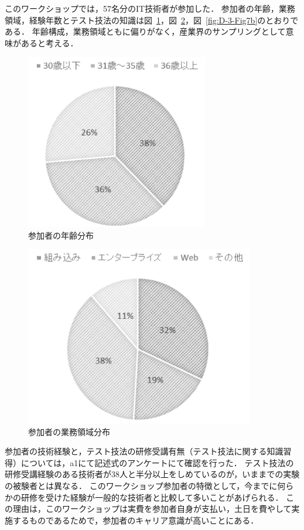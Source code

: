 このワークショップでは，57名分のIT技術者が参加した．
参加者の年齢，業務領域，経験年数とテスト技法の知識は図~\ref{fig:D-3-Fig6}，図~\ref{fig:D-3-Fig7}，図~\ref{fig:D-3-Fig7b}のとおりである．
年齢構成，業務領域ともに偏りがなく，産業界のサンプリングとして意味があると考える．

\begin{figure}[H]
\begin{center}
\includegraphics[width=8cm]{./image/D-3-Fig6.png}
\caption{参加者の年齢分布}
\label{fig:D-3-Fig6}
\end{center}
\end{figure}

\begin{figure}[H]
\begin{center}
\includegraphics[width=10cm]{./image/D-3-Fig7.png}
\caption{参加者の業務領域分布}
\label{fig:D-3-Fig7}
\end{center}
\end{figure}

参加者の技術経験と，テスト技法の研修受講有無（テスト技法に関する知識習得）については，a1にて記述式のアンケートにて確認を行った．
テスト技法の研修受講経験のある技術者が38人と半分以上をしめているのが，いままでの実験の被験者とは異なる．
このワークショップ参加者の特徴として，今までに何らかの研修を受けた経験が一般的な技術者と比較して多いことがあげられる．
この理由は，このワークショップは実費を参加者自身が支払い，土日を費やして実施するものであるためで，参加者のキャリア意識が高いことにある．

